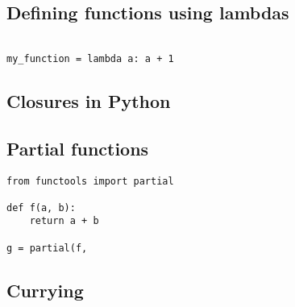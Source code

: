 

\subsection{Defining functions using lambdas}

\begin{verbatim}

my_function = lambda a: a + 1

\end{verbatim}

\subsection{Closures in Python}


\subsection{Partial functions}

\begin{verbatim}
from functools import partial

def f(a, b):
    return a + b
    
g = partial(f, 
\end{verbatim}

\subsection{Currying}



